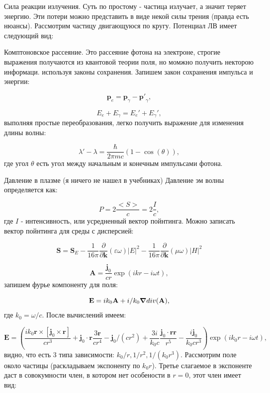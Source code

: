 \documentclass[10pt, a4paper]{article}
\begin{document}
Сила реакции излучения.
Суть по простому - частица излучает, а значит теряет энергию. Эти потери можно представить в виде некой силы трения
(правда есть нюансы). Рассмотрим частицу двигающуюся по кругу. Потенциал ЛВ имеет следующий вид:

Комптоновское рассеяние.
Это рассеяние фотона на электроне, строгие выражения получаются из квантовой теории поля, но момжно получить
некторою информаци. используя законы сохранения. Запишем закон сохранения импульса и энергии:

\begin{equation}
    \mathbf{p}_e=\mathbf{p}_{\gamma}-\mathbf{p'}_{\gamma},
\end{equation}

\begin{equation}
    E_e + E_{\gamma}=E_e' +E_{\gamma}',
\end{equation}
выполняя простые переобразования, легко получить выражение для изменения длины волны:

\begin{equation}
    \lambda'-\lambda=\frac{\hbar}{2\pi mc} (1-\cos(\theta)),
\end{equation}
где угол $\theta$ есть угол между начальным и конечным импульсами фотона.

Давление в плазме (я ничего не нашел  в учебниках)
Давление эм волны определяется как:

\begin{equation}
    P = 2\frac{<S>}{c} = 2\frac{I}{c},
\end{equation}
где $I$ - интенсивность, или усредненный вектор пойнтинга. Можно записать вектор пойнтинга для среды с дисперсией:

\begin{equation}
    \mathbf{S}=\mathbf{S}_E-\frac{1}{16\pi}\frac{\partial}{\partial\mathbf{k}}(\varepsilon\omega)|E|^2-\frac{1}{16\pi}\frac{\partial}{\partial\mathbf{k}}(\mu\omega)|H|^2
\end{equation}


\begin{equation}
    \mathbf{A}=\frac{\mathbf{j}_0}{cr} \exp(ikr - i\omega t),
\end{equation}
запишем фурье компоненту для поля: 

\begin{equation}
    \mathbf{E}=ik_0\mathbf{A}+i/k_0 \grad div(\mathbf{A}),
\end{equation}
где $k_0=\omega/c$. После вычислений имеем:

\begin{equation}
    \mathbf{E}=\left( 
    \frac{ik_0\mathbf{r}\times[\mathbf{j}_0\times \mathbf{r}]}{cr^3} +
    \mathbf{j}_0\cdot\mathbf{r}\frac{3\mathbf{r}}{cr^4} - \mathbf{j}_0/(cr^2) +
    \frac{3i}{k_0c}\frac{\mathbf{j}_0\cdot\mathbf{r} \mathbf{r}}{r^5} - \frac{i\mathbf{j}_0}{k_0 cr^3}
              \right) \exp(ik_0r-i\omega t),
\end{equation}
видно, что есть 3 типа зависимости: $k_0/r, 1/r^2, 1/(k_0r^3)$. Рассмотрим поле около частицы (раскладываем экспоненту
по $k_0r$). Третье слагаемое в экспоненте даст в совокумности член, в котором нет особености в $r=0$, этот член 
имеет вид:
\end{document}
